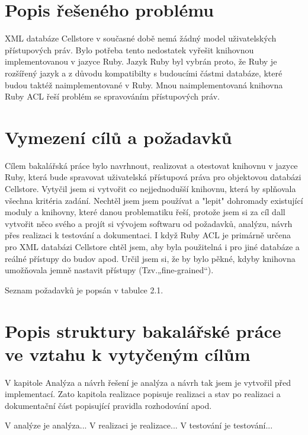 \documentclass[11pt,twoside,a4paper]{book}
\begin{document}
\section{Popis řešeného problému}

XML databáze Cellstore v současné době nemá žádný model uživatelských přístupových práv. Bylo potřeba tento nedostatek vyřešit knihovnou implementovanou v jazyce Ruby. Jazyk Ruby byl vybrán proto, že Ruby je rozšířený jazyk a z důvodu kompatibilty s  budoucími částmi databáze, které budou taktéž naimplementované v Ruby. Mnou naimplementovaná knihovna Ruby ACL řeší problém se spravováním přístupových práv.

\section{Vymezení cílů a požadavků}
Cílem bakalářská práce bylo navrhnout, realizovat a otestovat knihovnu v jazyce Ruby, která bude spravovat uživatelská přístupová práva pro objektovou databázi Cellstore.
Vytyčil jsem si vytvořit co nejjednodušší knihovnu, která by splňovala všechna kritéria zadání. Nechtěl jsem jsem používat a "lepit" dohromady existující moduly a knihovny, které danou problematiku řeší, protože jsem si za cíl dall vytvořit něco svého a projít si vývojem softwaru od požadavků, analýzu, návrh přes realizaci k testování a dokumentaci. 
I když Ruby ACL je primárně určena pro XML databázi Cellstore chtěl jsem, aby byla použitelná i pro jiné databáze a reálné přístupy do budov apod.
Určil jsem si, že by bylo pěkné, kdyby knihovna umožňovala jemně nastavit přístupy (Tzv.„fine-grained“).

Seznam požadavků je popsán v tabulce 2.1.%

\section{Popis struktury bakalářské práce ve vztahu k vytyčeným cílům}

V kapitole Analýza a návrh řešení je analýza a návrh tak jsem je vytvořil před implementací.
Zato kapitola realizace popisuje realizaci a stav po realizaci a dokumentační část popisující pravidla rozhodování apod.

V analýze je analýza...
V realizaci je realizace...
V testování je testování...
\end{document}
